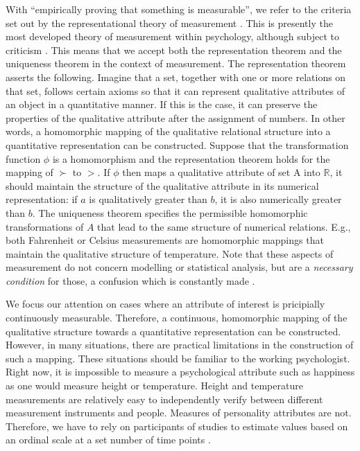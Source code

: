 \documentclass[utf8]{FrontiersinVancouver}
\begin{document}
With ``empirically proving that something is measurable'', we refer to the criteria set out by the representational theory of measurement \citep{krantzFoundationsMeasurement1971}. This is presently the most developed theory of measurement within psychology, although subject to criticism \citep{michellRepresentationalMeasurementTheory2021}. This means that we accept both the representation theorem and the uniqueness theorem in the context of measurement. The representation theorem asserts the following. Imagine that a set, together with one or more relations on that set, follows certain axioms so that it can represent qualitative attributes of an object in a quantitative manner. If this is the case, it can preserve the properties of the qualitative attribute after the assignment of numbers. In other words, a homomorphic mapping of the qualitative relational structure into a quantitative representation can be constructed. Suppose that the transformation function $\phi$ is a homomorphism and the representation theorem holds for the mapping of $\succ$ to $>$. If $\phi$ then maps a qualitative attribute of set A into $\mathbb{R}$, it should maintain the structure of the qualitative attribute in its numerical representation: if $a$ is qualitatively greater than $b$, it is also numerically greater than $b$. The uniqueness theorem specifies the permissible homomorphic transformations of $A$ that lead to the same structure of numerical relations. E.g., both Fahrenheit or Celsius measurements are homomorphic mappings that maintain the qualitative structure of temperature. Note that these aspects of measurement do not concern modelling or statistical analysis, but are a \textit{necessary condition} for those, a confusion which is constantly made \citep{michellItemResponseModels2004}. 

We focus our attention on cases where an attribute of interest is pricipially continuously measurable. Therefore, a continuous, homomorphic mapping of the qualitative structure towards a quantitative representation can be constructed. However, in many situations, there are practical limitations in the construction of such a mapping. These situations should be familiar to the working psychologist. Right now, it is impossible to measure a psychological attribute such as happiness as one would measure height or temperature. Height and temperature measurements are relatively easy to independently verify between different measurement instruments and people. Measures of personality attributes are not.  Therefore, we have to rely on participants of studies to estimate values based on an ordinal scale at a set number of time points \citep{friedWhatArePsychological2017, maraunAugustinianMethodologicalFamily2009}. 
\end{document}
